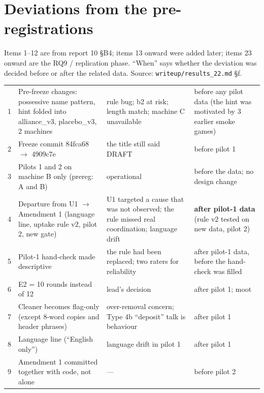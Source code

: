\documentclass[conference]{IEEEtran}
\begin{document}
\section{Deviations from the pre-registrations}
\label{app:dev}
{\scriptsize
Items 1--12 are from report 10 \S B4; items 13 onward were added later; items 23 onward are the RQ9 / replication phase.
``When'' says whether the deviation was decided before or after the related data. Source: \texttt{writeup/results\_22.md} \S f.
\setlength{\tabcolsep}{2pt}
\setlength{\emergencystretch}{1em}
\par\medskip\noindent
{}
\tabletail{\midrule}
\tablelasttail{\bottomrule}
\begin{supertabular}{@{}p{0.05\columnwidth}p{0.36\columnwidth}p{0.25\columnwidth}p{0.26\columnwidth}@{}}
1 & Pre-freeze changes: possessive name pattern, hint folded into alliance\_v3, placebo\_v3, 2 machines & rule bug; b2 at risk; length match; machine C unavailable & before any pilot data (the hint was motivated by 3 earlier smoke games)\\
2 & Freeze commit 84fca68 $\rightarrow$ 4909c7e & the title still said DRAFT & before pilot 1\\
3 & Pilots 1 and 2 on machine B only (prereg: A and B) & operational & before the data; no design change\\
4 & Departure from U1 $\rightarrow$ Amendment 1 (language line, uptake rule v2, pilot 2, new gate) & U1 targeted a cause that was not observed; the rule missed real coordination; language drift & \textbf{after pilot-1 data} (rule v2 tested on new data, pilot 2)\\
5 & Pilot-1 hand-check made descriptive & the rule had been replaced; two raters for reliability & after pilot-1 data, before the hand-check was filled\\
6 & E2 = 10 rounds instead of 12 & lead's decision & after pilot 1; moot\\
7 & Cleaner becomes flag-only (except 8-word copies and header phrases) & over-removal concern; Type 4b ``deposit'' talk is behaviour & after pilot 1\\
8 & Language line (``English only'') & language drift in pilot 1 & after pilot 1\\
9 & Amendment 1 committed together with code, not alone & --- & before pilot 2\\

\end{supertabular}}
\end{document}
